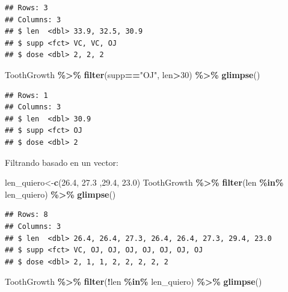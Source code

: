\documentclass[
]{book}
\newenvironment{Shaded}{\begin{snugshade}}{\end{snugshade}}
\newcommand{\DecValTok}[1]{\textcolor[rgb]{0.00,0.00,0.81}{#1}}
\newcommand{\FloatTok}[1]{\textcolor[rgb]{0.00,0.00,0.81}{#1}}
\newcommand{\FunctionTok}[1]{\textcolor[rgb]{0.13,0.29,0.53}{\textbf{#1}}}
\newcommand{\NormalTok}[1]{#1}
\newcommand{\OtherTok}[1]{\textcolor[rgb]{0.56,0.35,0.01}{#1}}
\newcommand{\SpecialCharTok}[1]{\textcolor[rgb]{0.81,0.36,0.00}{\textbf{#1}}}
\newcommand{\StringTok}[1]{\textcolor[rgb]{0.31,0.60,0.02}{#1}}
\begin{document}
\begin{verbatim}
## Rows: 3
## Columns: 3
## $ len  <dbl> 33.9, 32.5, 30.9
## $ supp <fct> VC, VC, OJ
## $ dose <dbl> 2, 2, 2
\end{verbatim}

\begin{Shaded}
\begin{Highlighting}[]
\NormalTok{ToothGrowth }\SpecialCharTok{\%\textgreater{}\%} \FunctionTok{filter}\NormalTok{(supp}\SpecialCharTok{==}\StringTok{"OJ"}\NormalTok{, len}\SpecialCharTok{\textgreater{}}\DecValTok{30}\NormalTok{) }\SpecialCharTok{\%\textgreater{}\%} \FunctionTok{glimpse}\NormalTok{()}
\end{Highlighting}
\end{Shaded}

\begin{verbatim}
## Rows: 1
## Columns: 3
## $ len  <dbl> 30.9
## $ supp <fct> OJ
## $ dose <dbl> 2
\end{verbatim}

\hfill\break
Filtrando basado en un vector:

\begin{Shaded}
\begin{Highlighting}[]
\NormalTok{len\_quiero}\OtherTok{\textless{}{-}}\FunctionTok{c}\NormalTok{(}\FloatTok{26.4}\NormalTok{, }\FloatTok{27.3}\NormalTok{ ,}\FloatTok{29.4}\NormalTok{, }\FloatTok{23.0}\NormalTok{)}
\NormalTok{ToothGrowth }\SpecialCharTok{\%\textgreater{}\%} \FunctionTok{filter}\NormalTok{(len }\SpecialCharTok{\%in\%}\NormalTok{ len\_quiero) }\SpecialCharTok{\%\textgreater{}\%} \FunctionTok{glimpse}\NormalTok{()}
\end{Highlighting}
\end{Shaded}

\begin{verbatim}
## Rows: 8
## Columns: 3
## $ len  <dbl> 26.4, 26.4, 27.3, 26.4, 26.4, 27.3, 29.4, 23.0
## $ supp <fct> VC, OJ, OJ, OJ, OJ, OJ, OJ, OJ
## $ dose <dbl> 2, 1, 1, 2, 2, 2, 2, 2
\end{verbatim}

\begin{Shaded}
\begin{Highlighting}[]
\NormalTok{ToothGrowth }\SpecialCharTok{\%\textgreater{}\%} \FunctionTok{filter}\NormalTok{(}\SpecialCharTok{!}\NormalTok{len }\SpecialCharTok{\%in\%}\NormalTok{ len\_quiero) }\SpecialCharTok{\%\textgreater{}\%} \FunctionTok{glimpse}\NormalTok{()}
\end{Highlighting}
\end{Shaded}
\end{document}
